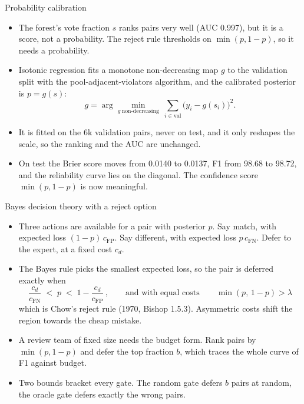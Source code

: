 \documentclass[aspectratio=169,10pt]{beamer}
\begin{document}
\begin{frame}{Probability calibration}
\begin{itemize}
\item The forest's vote fraction $s$ ranks pairs very well (AUC 0.997), but it is a score, not a probability. The reject rule thresholds on $\min(p,1-p)$, so it needs a probability.
\item Isotonic regression fits a monotone non-decreasing map $g$ to the validation split with the pool-adjacent-violators algorithm, and the calibrated posterior is $p=g(s)$:
\[
g=\arg\min_{g\ \text{non-decreasing}}\ \sum_{i\in\text{val}}\bigl(y_i-g(s_i)\bigr)^2 .
\]
\item It is fitted on the 6k validation pairs, never on test, and it only reshapes the scale, so the ranking and the AUC are unchanged.
\item On test the Brier score moves from 0.0140 to 0.0137, F1 from 98.68 to 98.72, and the reliability curve lies on the diagonal. The confidence score $\min(p,1-p)$ is now meaningful.
\end{itemize}
\end{frame}

\begin{frame}{Bayes decision theory with a reject option}
\begin{itemize}
\item Three actions are available for a pair with posterior $p$. Say match, with expected loss $(1-p)\,c_{\mathrm{FP}}$. Say different, with expected loss $p\,c_{\mathrm{FN}}$. Defer to the expert, at a fixed cost $c_d$.
\item The Bayes rule picks the smallest expected loss, so the pair is deferred exactly when
\[
\frac{c_d}{c_{\mathrm{FN}}}\;<\;p\;<\;1-\frac{c_d}{c_{\mathrm{FP}}}\,,
\qquad\text{and with equal costs}\qquad \min(p,\,1-p)>\lambda
\]
which is Chow's reject rule (1970, Bishop 1.5.3). Asymmetric costs shift the region towards the cheap mistake.
\item A review team of fixed size needs the budget form. Rank pairs by $\min(p,1-p)$ and defer the top fraction $b$, which traces the whole curve of F1 against budget.
\item Two bounds bracket every gate. The random gate defers $b$ pairs at random, the oracle gate defers exactly the wrong pairs.
\end{itemize}
\end{frame}
\end{document}
